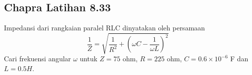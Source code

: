 \subsection{Chapra Latihan 8.33}
Impedansi dari rangkaian paralel RLC dinyatakan oleh persamaan
\begin{equation*}
\frac{1}{Z} = \sqrt{\frac{1}{R^2} + \left(
\omega C - \frac{1}{\omega L}
\right)^2}
\end{equation*}
Cari frekuensi angular $\omega$ untuk $Z=75$ ohm,
$R=225$ ohm,
$C = 0.6 \times 10^{-6}$ F
dan $L = 0.5 H$.
